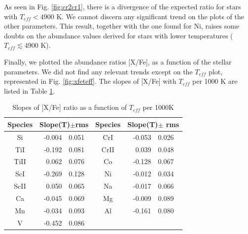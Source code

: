 \documentclass[oldversion]{aa}
\newcommand\T{\rule{0pt}{2.6ex}}
\newcommand\B{\rule[-1.2ex]{0pt}{0pt}}
\begin{document}
As seen in Fig. \ref{fig:cr2cr1}, there is a divergence of the expected ratio for stars with $T_{eff}<4900$ K. We cannot discern any significant trend on the plots of the other parameters. This result, together with the one found for Ni, raises some doubts on the abundance values derived for stars with lower temperatures ($T_{eff}\lesssim4900$ K).

Finally, we plotted the abundance ratios [X/Fe], as a function of the stellar parameters. We did not find any relevant trends except on the $T_{eff}$ plot, represented in Fig. \ref{fig:xfeteff}. %
The slopes of [X/Fe] with $T_{eff}$ per 1000 K are listed in Table \ref{table:slopes}.

\begin{table}[b]
\centering
\caption[Slopes  per 1000 K]{Slopes of [X/Fe] ratio as a function of $T_{eff}$ per 1000K}
\begin{tabular}{ c r@{$\pm$}l | c r@{$\pm$}l }
\hline
\hline
Species \T & \multicolumn {2}{c}{Slope(T)$\pm$rms} & Species & \multicolumn {2}{c}{Slope(T)$\pm$ rms} \B \\
\hline
         Si &   -0.004  &   0.051 & CrI &   -0.053   &  0.026 \\
         TiI &    -0.192  &  0.081 & CrII &    0.039   &  0.048 \\
        TiII &    0.062    & 0.076 & Co &    -0.128   &  0.067 \\
         ScI &    -0.269  &    0.128 & Ni &   -0.012   &  0.034 \\
        ScII &    0.050  &   0.065 & Na &   -0.017   &  0.066 \\
          Ca &   -0.045   &   0.069 & Mg &  -0.009   &  0.089 \\
          Mn &   -0.034   &  0.093 & Al &    -0.161   &  0.080 \\
           V &    -0.452   &   0.086 \\
\hline

\end{tabular}
\label {table:slopes}
\end{table}
\end{document}
